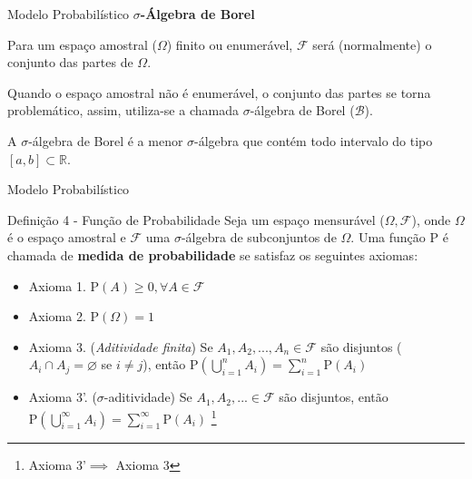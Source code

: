 \documentclass[10pt]{beamer}
\begin{document}
\begin{frame}[fragile]{Modelo Probabilístico}
\textbf{$\sigma$-Álgebra de Borel}

Para um espaço amostral ($\Omega$) finito ou enumerável, $\mathcal{F}$ será (normalmente)
o conjunto das partes de $\Omega$.

Quando o espaço amostral não é enumerável, o conjunto das partes se torna problemático, assim, utiliza-se a chamada $\sigma$-álgebra de Borel ($\mathcal{B}$).

A $\sigma$-álgebra de Borel é a menor $\sigma$-álgebra que contém todo intervalo
do tipo $[a,b] \subset \mathbb{R}$.
\end{frame}



\begin{frame}[fragile]{Modelo Probabilístico}
\begin{block}{Definição 4 - Função de Probabilidade }
Seja um espaço mensurável ($\Omega, \mathcal{F}$), onde $\Omega$ é o espaço amostral e $\mathcal{F}$ uma $\sigma$-álgebra de subconjuntos de $\Omega$. Uma função $\mathrm{P}$ é chamada de \textbf{medida de probabilidade} se satisfaz os seguintes axiomas:
\begin{itemize}
    \item Axioma 1. \quad $\mathrm{P}(A)\geq 0, \forall A \in \mathcal{F}$
    \item Axioma 2. \quad $\mathrm{P}(\Omega)=1$
    \item Axioma 3. (\textit{Aditividade finita}) Se $A_1, A_2,..., A_n \in \mathcal{F}$ são disjuntos ($A_i \cap A_j = \varnothing$ se $i\neq j$), então $\mathrm{P}(\bigcup\limits_{i=1}^{n} A_{i})=\sum_{i=1}^{n} \mathrm{P}(A_i)$
    \item Axioma 3'. ($\sigma$-aditividade) Se $A_1, A_2,... \in \mathcal{F}$ são disjuntos, então $\mathrm{P}(\bigcup\limits_{i=1}^{\infty} A_{i})=\sum_{i=1}^{\infty} \mathrm{P}(A_i)$
    \let\thefootnote\relax\footnote{Axioma 3'$\implies$ Axioma 3}
\end{itemize}
\end{block}
\end{frame}
\end{document}
